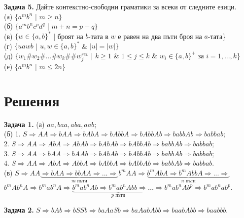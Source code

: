\documentclass{article}
\begin{document}
    \vspace{15pt}

    \textbf{Задача 5.} Дайте контекстно-свободни граматики за всеки от следните езици. \\
    (а) $\{a^mb^n$ | $m \geq n\}$ \\
    (б) $\{a^mb^nc^pd^q$ | $m + n = p + q\}$ \\
    (в) $\{w \in \{a,b\}^*$ | броят на $b$-тата в $w$ е равен на два пъти броя на $a$-тата\} \\
    (г) $\{uawb$ | $u,w \in \{a,b\}^*$ \& $|u| = |w|\}$ \\
    (д) $\{w_1\#w_2\#...\#w_k\#\#w_j^{rev}$ | $k \geq 1$ \& $1 \leq j \leq k$ \& $w_i \in \{a,b\}^+$ за $i = 1,...,k$\} \\
    (е) $\{a^mb^n$ | $m \leq 2n$\}
\vspace{25pt}

\section{Решения}
    \textbf{Задача 1.} (а) $aa,baa,aba,aab$; \\
    (б) 1. $S \Rightarrow AA \Rightarrow bAA \Rightarrow bAbA \Rightarrow bAbbA \Rightarrow bAbbAb \Rightarrow babbAb \Rightarrow babbab$; \\
    2. $S \Rightarrow AA \Rightarrow AbA \Rightarrow AbAb \Rightarrow bAbAb \Rightarrow bAbbAb \Rightarrow babbAb \Rightarrow babbab$; \\
    3. $S \Rightarrow AA \Rightarrow bAA \Rightarrow bAAb \Rightarrow bAbAb \Rightarrow bAbbAb \Rightarrow babbAb \Rightarrow babbab$; \\
    4. $S \Rightarrow AA \Rightarrow AbA \Rightarrow AbbA \Rightarrow bAbbA \Rightarrow bAbbAb \Rightarrow babbAb \Rightarrow babbab$. \\
    (в) $S \Rightarrow AA \underbrace{\Rightarrow bAA \Rightarrow bbAA \Rightarrow ... \Rightarrow}_\text{$m$ пъти} b^mAA \Rightarrow \underbrace{b^mAbA \Rightarrow b^mAbbA \Rightarrow ... \Rightarrow}_\text{$n$ пъти}$ \\  $b^mAb^nA \Rightarrow b^mab^nA \Rightarrow \underbrace{b^mab^nAb \Rightarrow b^mab^nAbb \Rightarrow ... \Rightarrow}_\text{$p$ пъти} b^mab^nAb^p \Rightarrow b^mab^nab^p$.

    \vspace{15pt}

    \textbf{Задача 2.} $S \Rightarrow bAb \Rightarrow bSSb \Rightarrow baAaSb \Rightarrow baAabAbb \Rightarrow baabAbb \Rightarrow baabbb$.
\end{document}
